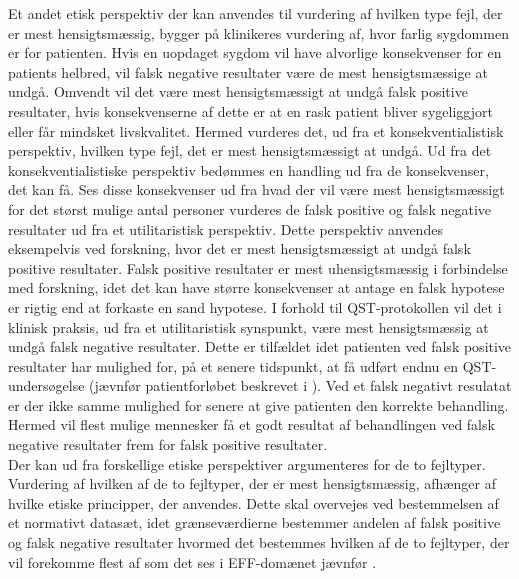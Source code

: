 Et andet etisk perspektiv der kan anvendes til vurdering af hvilken type fejl, der er mest hensigtsmæssig, bygger på klinikeres vurdering af, hvor farlig sygdommen er for patienten. Hvis en uopdaget sygdom vil have alvorlige konsekvenser for en patients helbred, vil falsk negative resultater være de mest hensigtsmæssige at undgå. Omvendt vil det være mest hensigtsmæssigt at undgå falsk positive resultater, hvis konsekvenserne af dette er at en rask patient bliver sygeliggjort eller får mindsket livskvalitet. \citep{Kraemer2011} Hermed vurderes det, ud fra et konsekventialistisk perspektiv, hvilken type fejl, det er mest hensigtsmæssigt at undgå. Ud fra det konsekventialistiske perspektiv bedømmes en handling ud fra de konsekvenser, det kan få. Ses disse konsekvenser ud fra hvad der vil være mest hensigtsmæssigt for det størst mulige antal personer vurderes de falsk positive og falsk negative resultater ud fra et utilitaristisk perspektiv. Dette perspektiv anvendes eksempelvis ved forskning, hvor det er mest hensigtsmæssigt at undgå falsk positive resultater. Falsk positive resultater er mest uhensigtsmæssig i forbindelse med forskning, idet det kan have større konsekvenser at antage en falsk hypotese er rigtig end at forkaste en sand hypotese. \citep{Kraemer2011} I forhold til QST-protokollen vil det i klinisk praksis, ud fra et utilitaristisk synspunkt, være mest hensigtsmæssig at undgå falsk negative resultater. Dette er tilfældet idet patienten ved falsk positive resultater har mulighed for, på et senere tidspunkt, at få udført endnu en QST-undersøgelse (jævnfør patientforløbet beskrevet i ). Ved et falsk negativt resulatat er der ikke samme mulighed for senere at give patienten den korrekte behandling. Hermed vil flest mulige mennesker få et godt resultat af behandlingen ved falsk negative resultater frem for falsk positive resultater. \\
Der kan ud fra forskellige etiske perspektiver argumenteres for de to fejltyper. Vurdering af hvilken af de to fejltyper, der er mest hensigtsmæssig, afhænger af hvilke etiske principper, der anvendes. Dette skal overvejes ved bestemmelsen af et normativt datasæt, idet grænseværdierne bestemmer andelen af falsk positive og falsk negative resultater hvormed det bestemmes hvilken af de to fejltyper, der vil forekomme flest af som det ses i EFF-domænet jævnfør .  


